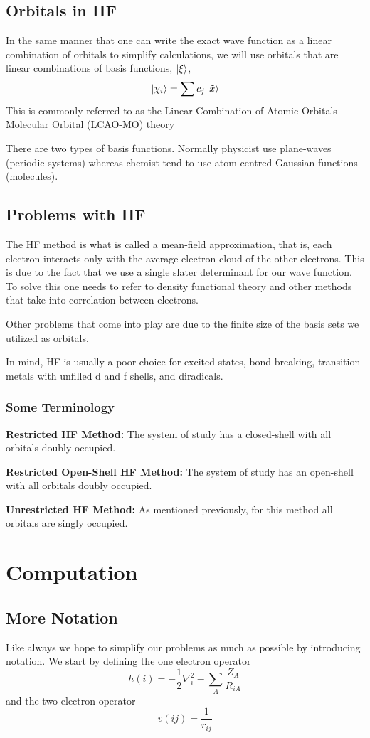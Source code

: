 \documentclass[a4paper]{article}
\begin{document}
\subsection{Orbitals in HF}
In the same manner that one can write the exact wave function as a linear combination of orbitals to simplify calculations, we will use orbitals that are linear combinations of basis functions, $\ket{\xi}$,
$$
\ket{\chi_i} = \sum c_j \ket{\tilde{x}}
$$
This is commonly referred to as the Linear Combination of Atomic Orbitals Molecular Orbital (LCAO-MO) theory 

There are two types of basis functions.
Normally physicist use plane-waves (periodic systems) whereas chemist tend to use atom centred Gaussian functions (molecules).

\subsection{Problems with HF}
The HF method is what is called a mean-field approximation, that is, each electron interacts only with the average electron cloud of the other electrons.
This is due to the fact that we use a single slater determinant for our wave function.
To solve this one needs to refer to density functional theory and other methods that take into correlation between electrons.

Other problems that come into play are due to the finite size of the basis sets we utilized as orbitals.

In mind, HF is usually a poor choice for excited states, bond breaking, transition metals with unfilled d and f shells, and diradicals. 

\subsubsection{Some Terminology}
\textbf{Restricted HF Method: } The system of study has a closed-shell with all orbitals doubly occupied.

\textbf{Restricted Open-Shell HF Method: } The system of study has an open-shell with all orbitals doubly occupied.

\textbf{Unrestricted HF Method: } As mentioned previously, for this method all orbitals are singly occupied.


\section{Computation}
\subsection{More Notation}
Like always we hope to simplify our problems as much as possible by introducing notation.
We start by defining the one electron operator
$$
h(i) = -\frac{1}{2}\nabla^{2}_{i} - \sum_A \frac{Z_A}{R_{iA}}
$$
and the two electron operator
$$
v(ij) = \frac{1}{r_{ij}}
$$
\end{document}
